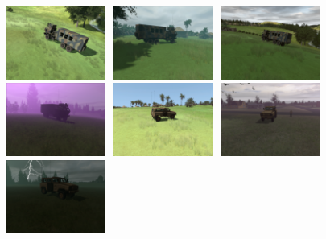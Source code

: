 \begin{figure}[H]
\centering
\subcaptionbox{}
  {\includegraphics[height=2.4cm, width=3.4cm]{images/vbs3/realistic-lighting/light-variation/1.png}}
\subcaptionbox{}%
  {\includegraphics[height=2.4cm, width=3.4cm]{images/vbs3/realistic-lighting/light-variation/2.png}}
\subcaptionbox{}%
  {\includegraphics[height=2.4cm, width=3.4cm]{images/vbs3/realistic-lighting/light-variation/3.png}}
\subcaptionbox{}
    {\includegraphics[height=2.4cm, width=3.4cm]{images/vbs3/realistic-lighting/light-variation/8.png}}
\subcaptionbox{}%
  {\includegraphics[height=2.4cm, width=3.4cm]{images/vbs3/realistic-lighting/light-variation/car/1.png}}
\subcaptionbox{}%
  {\includegraphics[height=2.4cm, width=3.4cm]{images/vbs3/realistic-lighting/light-variation/car/2.png}}
\subcaptionbox{}%
  {\includegraphics[height=2.4cm, width=3.4cm]{images/vbs3/realistic-lighting/light-variation/car/3.png}}

\end{figure}
